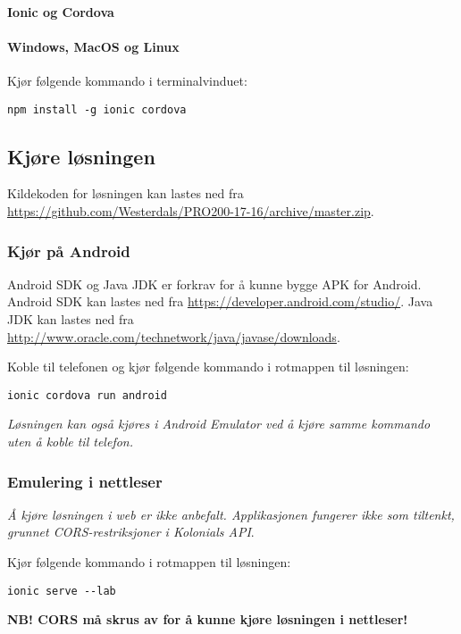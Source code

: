 \paragraph{\textbf{Ionic og Cordova}}
\paragraph{Windows, MacOS og Linux\newline}
Kjør følgende kommando i terminalvinduet:
\begin{verbatim}
npm install -g ionic cordova
\end{verbatim}

\subsection{\textbf{Kjøre løsningen}}
Kildekoden for løsningen kan lastes ned fra \url{https://github.com/Westerdals/PRO200-17-16/archive/master.zip}.

\subsubsection{\textbf{Kjør på Android}}
Android SDK og Java JDK er forkrav for å kunne bygge APK for Android.
Android SDK kan lastes ned fra \url{https://developer.android.com/studio/}.
Java JDK kan lastes ned fra \url{http://www.oracle.com/technetwork/java/javase/downloads}.

Koble til telefonen og kjør følgende kommando i rotmappen til løsningen:
\begin{verbatim}
ionic cordova run android
\end{verbatim}

\textit{Løsningen kan også kjøres i Android Emulator ved å kjøre samme kommando uten å koble til telefon.}

\subsubsection{\textbf{Emulering i nettleser}}
\textit{Å kjøre løsningen i web er ikke anbefalt. Applikasjonen fungerer ikke som tiltenkt, grunnet CORS-restriksjoner i Kolonials API}.

Kjør følgende kommando i rotmappen til løsningen:
\begin{verbatim}
ionic serve --lab
\end{verbatim}
\textbf{NB! CORS må skrus av for å kunne kjøre løsningen i nettleser!}

